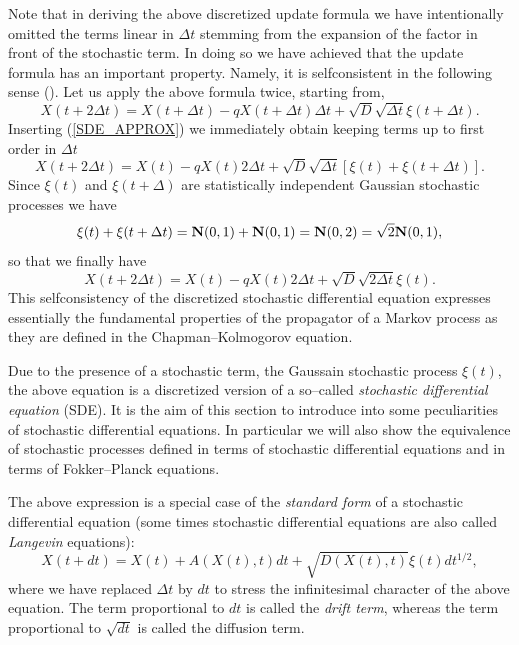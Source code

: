 Note that in deriving the above discretized update formula we have 
intentionally omitted the terms linear in $\Delta t$ stemming from 
the expansion of the factor in front of the stochastic term. In 
doing so we have achieved that the update formula has an important
property. Namely, it is selfconsistent in the following sense
(\cite{GILLESPIE}). Let us apply the above formula twice, starting from,
\begin{equation*}
X(t+2\Delta t) = X(t+\Delta t) 
 - qX(t+ \Delta t) \Delta t + \sqrt{D} \sqrt{\Delta t} \xi(t+\Delta t).
\end{equation*}
Inserting (\ref{SDE_APPROX}) we immediately obtain keeping 
terms up to first order in $\Delta t$
\begin{equation*}
X(t+2 \Delta t) = X(t) - q X(t) 2 \Delta t +
   \sqrt{D} \sqrt{\Delta t} [\xi(t) + \xi(t+\Delta t)].
\end{equation*}
Since $\xi(t)$ and $\xi(t+\Delta)$ are statistically independent
Gaussian stochastic processes we have
\begin{equation*}
\xi(t) + \xi(t+\Delta t) = {\bf N}(0,1) + {\bf N}(0,1) =
  {\bf N}(0,2) = \sqrt{2} {\bf N}(0,1),
\end{equation*}
so that we finally have
\begin{equation*}
X(t+2 \Delta t) = X(t) - q X(t) 2 \Delta t +
   \sqrt{D} \sqrt{2 \Delta t} \xi(t).
\end{equation*}
This selfconsistency of the discretized stochastic differential 
equation expresses essentially the fundamental properties
of the propagator of a Markov process as they are defined in
the Chapman--Kolmogorov equation.


Due to the presence of a stochastic term, the Gaussain stochastic
process $\xi(t)$, the above equation is a discretized version of a 
so--called {\em stochastic differential equation} (SDE). It is the aim
of this section to introduce into some  peculiarities of stochastic
differential equations. In particular we will also show the
equivalence of stochastic processes defined in terms of stochastic differential
equations and in terms of Fokker--Planck equations.

The above expression is a special case of the  {\em standard form} of
a stochastic differential equation (some times stochastic
differential equations are also called {\em Langevin} equations):
\begin{equation}
\label{SDE_LANGEVIN_DISCR}
X(t+dt) = X(t) + A(X(t),t)dt + \sqrt{D(X(t),t)} \xi(t) dt^{1/2},
\end{equation}
where we have replaced $\Delta t$  by $dt$ to stress the infinitesimal
character of the above equation. The term proportional to $dt$ is
called the {\em drift term}, whereas the term proportional to
$\sqrt{dt}$ is called the diffusion term. 

